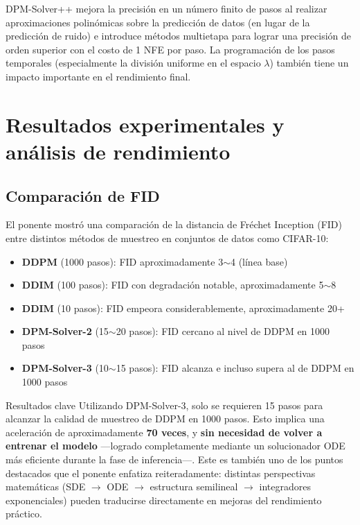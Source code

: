 \documentclass[a4paper]{article}
\begin{document}
DPM-Solver++ mejora la precisión en un número finito de pasos al realizar aproximaciones polinómicas sobre la predicción de datos (en lugar de la predicción de ruido) e introduce métodos multietapa para lograr una precisión de orden superior con el costo de 1 NFE por paso. La programación de los pasos temporales (especialmente la división uniforme en el espacio $\lambda$) también tiene un impacto importante en el rendimiento final.
\section{Resultados experimentales y análisis de rendimiento}

\subsection{Comparación de FID}

El ponente mostró una comparación de la distancia de Fréchet Inception (FID) entre distintos métodos de muestreo en conjuntos de datos como CIFAR-10:

\begin{itemize}
    \item \textbf{DDPM} (1000 pasos): FID aproximadamente 3$\sim$4 (línea base)
    \item \textbf{DDIM} (100 pasos): FID con degradación notable, aproximadamente 5$\sim$8
    \item \textbf{DDIM} (10 pasos): FID empeora considerablemente, aproximadamente 20+
    \item \textbf{DPM-Solver-2} (15$\sim$20 pasos): FID cercano al nivel de DDPM en 1000 pasos
    \item \textbf{DPM-Solver-3} (10$\sim$15 pasos): FID alcanza e incluso supera al de DDPM en 1000 pasos
\end{itemize}

\begin{importantbox}{Resultados clave}
Utilizando DPM-Solver-3, solo se requieren 15 pasos para alcanzar la calidad de muestreo de DDPM en 1000 pasos. Esto implica una aceleración de aproximadamente \textbf{70 veces}, y \textbf{sin necesidad de volver a entrenar el modelo} —logrado completamente mediante un solucionador ODE más eficiente durante la fase de inferencia—. Este es también uno de los puntos destacados que el ponente enfatiza reiteradamente: distintas perspectivas matemáticas (SDE $\to$ ODE $\to$ estructura semilineal $\to$ integradores exponenciales) pueden traducirse directamente en mejoras del rendimiento práctico.
\end{importantbox}
\end{document}
